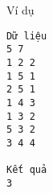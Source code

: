 Ví dụ
\begin{verbatim}
Dữ liệu	
5 7
1 2 2
1 5 1
2 5 1
1 4 3
1 3 2
5 3 2
3 4 4	

Kết quả
3
\end{verbatim}